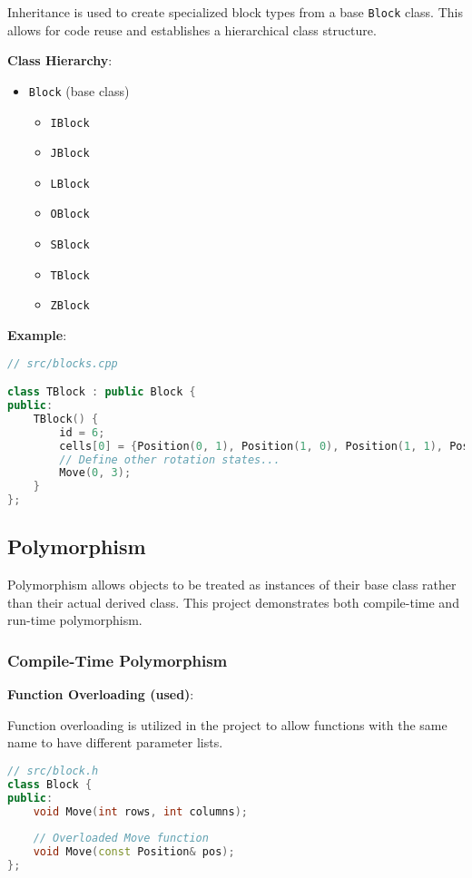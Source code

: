 \documentclass{article}
\begin{document}
Inheritance is used to create specialized block types from a base \texttt{Block} class. This allows for code reuse and establishes a hierarchical class structure.

\textbf{Class Hierarchy}:

\begin{itemize}
    \item \texttt{Block} (base class)
    \begin{itemize}
        \item \texttt{IBlock}
        \item \texttt{JBlock}
        \item \texttt{LBlock}
        \item \texttt{OBlock}
        \item \texttt{SBlock}
        \item \texttt{TBlock}
        \item \texttt{ZBlock}
    \end{itemize}
\end{itemize}

\textbf{Example}:

\begin{lstlisting}[language=C++]
// src/blocks.cpp

class TBlock : public Block {
public:
    TBlock() {
        id = 6;
        cells[0] = {Position(0, 1), Position(1, 0), Position(1, 1), Position(1, 2)};
        // Define other rotation states...
        Move(0, 3);
    }
};
\end{lstlisting}

\subsection{Polymorphism}

Polymorphism allows objects to be treated as instances of their base class rather than their actual derived class. This project demonstrates both compile-time and run-time polymorphism.

\subsubsection{Compile-Time Polymorphism}

\textbf{Function Overloading (used)}:

Function overloading is utilized in the project to allow functions with the same name to have different parameter lists.

\begin{lstlisting}[language=C++]
// src/block.h
class Block {
public:
    void Move(int rows, int columns);
    
    // Overloaded Move function
    void Move(const Position& pos);
};
\end{lstlisting}
\end{document}
